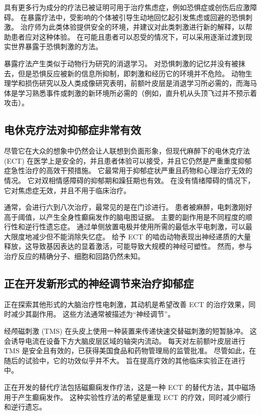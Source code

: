 具有更多行为成分的疗法已被证明可用于治疗焦虑症，例如恐惧症或创伤后应激障碍。
在暴露疗法中，受影响的个体被引导生动地回忆起引发焦虑或回避的恐惧刺激。
治疗师为此类体验提供安全的环境，并建议对此类刺激进行新的解释，以帮助患者应对这种体验。
在可能且患者可以忍受的情况下，可以采用逐渐过渡到现实世界暴露于恐惧刺激的方法。


暴露疗法产生类似于动物行为研究的消退学习。
对恐惧刺激的记忆并没有被抹去，但是恐惧反应被新的信息所抑制，即刺激和经历它的环境并不危险。
动物生理学和损伤研究以及人类成像研究表明，前额叶皮层是消退学习所必需的，而海马体是学习熟悉事件或刺激的新环境所必需的（例如，直升机从头顶飞过并不预示着攻击）。



\subsection{电休克疗法对抑郁症非常有效}

尽管它在大众的想象中仍然会让人联想到负面形象，但现代麻醉下的电休克疗法 (ECT) 在医学上是安全的，并且患者体验可以接受，并且它仍然是严重重度抑郁症急性治疗的高效干预措施。
它最常用于抑郁症状严重且药物和心理治疗无效的情况。
它对双相情感障碍的抑郁期和躁狂期也有效。
在没有情绪障碍的情况下，它对焦虑症无效，并且不用于临床治疗。


通常，会进行六到八次治疗，最常见的是在门诊进行。
患者被麻醉，电刺激刚好高于阈值，以产生全身性癫痫发作的脑电图证据。
主要的副作用是不同程度的顺行性和逆行性遗忘症。
通过单侧放置电极并使用所需的最低水平电刺激，可以最大限度地减少但不能消除失忆症。
给予 ECT 的啮齿动物表现出神经递质的大量释放，这导致基因表达的显着激活，可能导致大规模的神经可塑性。
然而，参与治疗反应的精确分子、细胞和回路仍然未知。



\subsection{正在开发新形式的神经调节来治疗抑郁症}

正在探索其他形式的大脑治疗性电刺激，其动机是希望改善 ECT 的治疗效果，同时减少其副作用。
这些方法通常被描述为“神经调节”。


经颅磁刺激 (TMS) 在头皮上使用一种装置来传递快速交替磁刺激的短暂脉冲。
这会诱导电流在设备下方大脑皮层区域的轴突内流动。
每天对左前额叶皮层进行 TMS 是安全且有效的，已获得美国食品和药物管理局的监管批准。
尽管如此，在随后的试验中，它的功效似乎并不大。
旨在提高疗效的其他临床实验正在进行中。


正在开发的替代疗法包括磁癫痫发作疗法，这是一种 ECT 的替代方法，其中磁场用于产生癫痫发作。
这种实验性疗法的希望是重现 ECT 的疗效，同时减少顺行和逆行遗忘。


